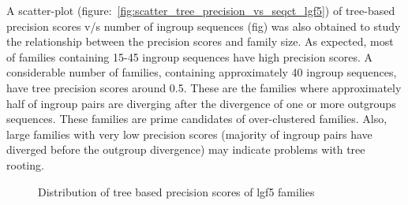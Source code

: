 \documentclass{article}
\begin{document}
		A scatter-plot (figure:~\ref{fig:scatter_tree_precision_vs_seqct_lgf5}) of tree-based precision scores v/s number of ingroup sequences (fig) was also obtained to study the relationship between the precision scores and family size. As expected, most of families containing 15-45 ingroup sequences  have high precision scores. A considerable number of families, containing approximately 40 ingroup sequences, have tree precision scores around 0.5. These are the families where approximately half of ingroup pairs are diverging after the divergence of one or more outgroups sequences. These families are prime candidates of over-clustered families. Also, large families with very low precision scores (majority of ingroup pairs have diverged before the outgroup divergence) may indicate problems with tree rooting.
		
		\begin{figure}[h!]
			\caption{Distribution of tree based precision scores of lgf5 families}
			\label{fig:hist_tree_precision_scores_lgf5}
		\end{figure}
		
\end{document}
